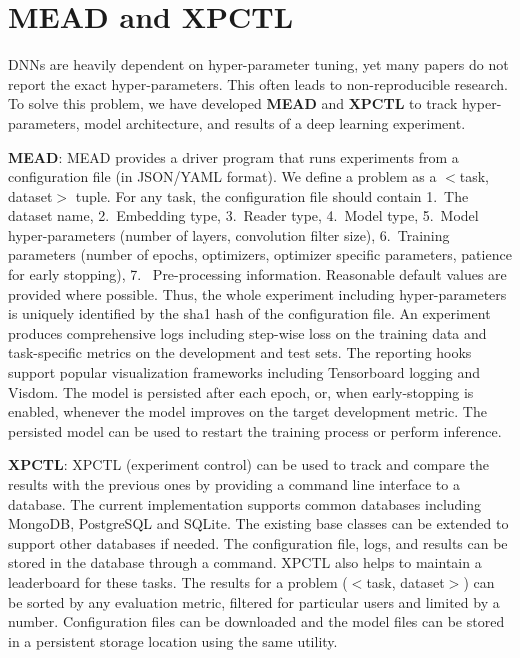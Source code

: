 \documentclass[11pt,a4paper]{article}
\begin{document}
\section{MEAD and XPCTL}
\label{sec:meadxpctl}

DNNs are heavily dependent on hyper-parameter tuning, yet many papers do not report the exact hyper-parameters. This often leads to non-reproducible research. To solve this problem, we have developed \textbf{MEAD} and \textbf{XPCTL} to track hyper-parameters, model architecture, and results of a deep learning experiment.

\textbf{MEAD}: MEAD provides a driver program that runs experiments from a configuration file (in JSON/YAML format). We define a problem as a $<$task, dataset$>$ tuple. For any task, the configuration file should contain 1.~The dataset name, 2.~Embedding type, 3.~Reader type, 4.~Model type, 5.~Model hyper-parameters (number of layers, convolution filter size), 6.~Training parameters (number of epochs, optimizers, optimizer specific parameters, patience for early stopping), 7. ~Pre-processing information. Reasonable default values are provided where possible. Thus, the whole experiment including hyper-parameters is uniquely identified by the sha1 hash of the configuration file. An experiment produces comprehensive logs including step-wise loss on the training data and task-specific metrics on the development and test sets. The reporting hooks support popular visualization frameworks including Tensorboard logging and Visdom. The model is persisted after each epoch, or, when early-stopping is enabled, whenever the model improves on the target development metric. The persisted model can be used to restart the training process or perform inference. 

\textbf{XPCTL}: XPCTL (experiment control) can be used to track and compare the results with the previous ones by providing a command line interface to a database. The current implementation supports common databases including MongoDB, PostgreSQL and SQLite. The existing base classes can be extended to support other databases if needed. The configuration file, logs, and results can be stored in the database through a command. XPCTL also helps to maintain a leaderboard for these tasks. The results for a problem ($<$task, dataset$>$) can be sorted by any evaluation metric, filtered for particular users and limited by a number. Configuration files can be downloaded and the model files can be stored in a persistent storage location using the same utility. 
\end{document}
